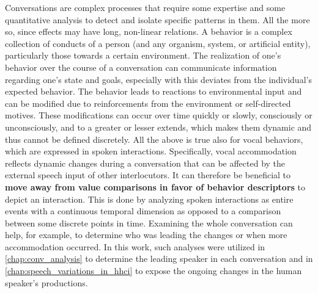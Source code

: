 Conversations are complex processes that require some expertise and some quantitative analysis to detect and isolate specific patterns in them.
All the more so, since effects may have long, non-linear relations.
A behavior is a complex collection of conducts of a person (and any organism, system, or artificial entity), particularly those towards a certain environment.
The realization of one's behavior over the course of a conversation can communicate information regarding one's state and goals, especially with this deviates from the individual's expected behavior.
The behavior leads to reactions to environmental input and can be modified due to reinforcements from the environment or self-directed motives.
These modifications can occur over time quickly or slowly, consciously or unconsciously, and to a greater or lesser extends, which makes them dynamic and thus cannot be defined discretely.
All the above is true also for vocal behaviors, which are expressed in spoken interactions.
Specifically, vocal accommodation reflects dynamic changes during a conversation that can be affected by the external speech input of other interlocutors.
It can therefore be beneficial to \textbf{move away from value comparisons in favor of behavior descriptors} to depict an interaction.
This is done by analyzing spoken interactions as entire events with a continuous temporal dimension as opposed to a comparison between some discrete points in time.
Examining the whole conversation can help, for example, to determine who was leading the changes or when more accommodation occurred.
In this work, such analyses were utilized in \cref{chap:conv_analysis} to determine the leading speaker in each conversation and in \cref{chap:speech_variations_in_hhci} to expose the ongoing changes in the human speaker's productions.

